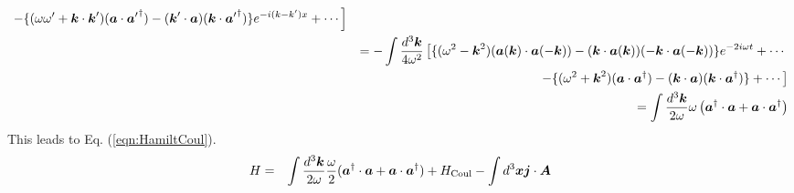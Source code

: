 {\begin{eqnarray*}
\left.
-
\{
(\omega \omega' +
\bld{k}\cdot \bld{k}')
(\bld{a}\cdot {\bld{a}'}^\dagger)
-
(\bld{k}'\cdot \bld{a})
(\bld{k}\cdot {\bld{a}'}^\dagger)
\}
e^{-i(k- k')x}
+ \cdots
\right]
\\
&&
=
- \int
\frac{d^3 \bld{k}} 
{4 \omega^2}
\left[
\{
(\omega^2 
-
\bld{k}^2)
(\bld{a}(\bld{k})\cdot\bld{a}(-\bld{k}))
-
(\bld{k}\cdot \bld{a}(\bld{k}))
(-\bld{k}\cdot \bld{a}(-\bld{k}))
\}
e^{-2i\omega t}
+ \cdots
\right.
\\
&&
\hspace{25mm}
\left.
-
\{
(\omega^2 +
\bld{k}^2)
(\bld{a}\cdot {\bld{a}}^\dagger)
-
(\bld{k}\cdot \bld{a})
(\bld{k}\cdot {\bld{a}}^\dagger)
\}
+ \cdots
\right]
\\
&&
=
\int
\frac{d^3 \bld{k}}{2 \omega}
\omega
\left(
\bld{a}^\dagger \cdot \bld{a}
+
\bld{a} \cdot \bld{a}^\dagger
\right)
\end{eqnarray*}
This leads to Eq. (\ref{eqn:HamiltCoul}).
}%
\begin{eqnarray}
H 
&=&
\int
\frac{d^3 \mbox{\boldmath $k$}}{2 \omega} 
\frac{\omega}{2}
(\mbox{\boldmath $a$}^\dagger\cdot \mbox{\boldmath $a$} + \mbox{\boldmath $a$}\cdot \mbox{\boldmath $a$}^\dagger)
+
H_{\mbox{\scriptsize Coul}}
- 
\int
d^3 \mbox{\boldmath $x$}
\mbox{\boldmath $j$} \cdot \mbox{\boldmath $A$}
\label{eqn:HamiltCoul}
\end{eqnarray}

